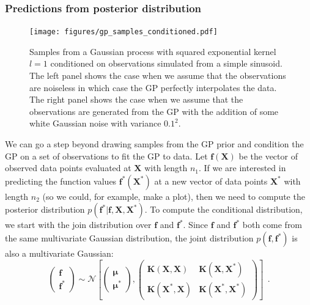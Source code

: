 \documentclass[12pt,dvipsnames]{report}
\renewcommand{\vec}[1]{\boldsymbol{\mathbf{#1}}}
\newcommand{\hquad}{~~}
\begin{document}
\subsubsection{Predictions from posterior distribution}
\begin{figure}[t]
    \begin{centering}
        \texttt{[image: figures/gp\_samples\_conditioned.pdf]}
        \caption{Samples from a Gaussian process with squared exponential kernel $l=1$
            conditioned on observations simulated from a simple sinusoid.
            The left panel shows the case when we assume that
            the observations are noiseless in which case the GP perfectly interpolates the data.
            The right panel shows the case when we assume that the observations are generated
            from the GP with the addition of some white Gaussian noise with variance $0.1^2$.}
        \label{fig:gp_samples_conditioned}
    \end{centering}
\end{figure}
We can go a step beyond drawing samples from the GP prior and condition the GP
on a set of observations to fit the GP to data. Let $\vec{f}(\vec{X})$ be
the vector of observed data points evaluated at $\vec{X}$ with length $n_1$. If
we are interested in predicting the function values $\vec{f}^*(\vec{X}^*)$ at a
new vector of data points $\vec{X}^*$ with length $n_2$ (so we could, for
example, make a plot), then we need to compute the posterior distribution
$p(\vec{f}^*\lvert \vec{f}, \vec{X},\vec{X}^*)$. To compute the
conditional distribution, we start with the join distribution over $\vec{f}$
and $\vec{f}^*$. Since $\vec{f}$ and $\vec{f}^*$ both come from the same
multivariate Gaussian distribution, the joint distribution $p(\vec{f},
    \vec{f}^*)$ is also a multivariate Gaussian:
\begin{equation}
    \begin{pmatrix}
        \vec{f} \\
        \vec{f}^*
    \end{pmatrix} \sim \mathcal{N}\left[\begin{pmatrix}
            \vec{\mu} \\
            \vec{\mu}^*
        \end{pmatrix},\begin{pmatrix}
            \vec K(\vec{X},\vec{X})    & \vec K(\vec{X},\vec{X}^*)   \\
            \vec K(\vec{X}^*, \vec{X}) & \vec K(\vec{X}^*,\vec{X}^*)
        \end{pmatrix}\right]
        \hquad.
\end{equation}
\end{document}
